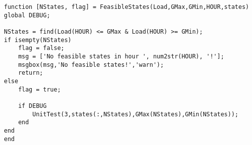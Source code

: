 \begin{verbatim}
function [NStates, flag] = FeasibleStates(Load,GMax,GMin,HOUR,states)
global DEBUG;

NStates = find(Load(HOUR) <= GMax & Load(HOUR) >= GMin);
if isempty(NStates)
    flag = false;
    msg = ['No feasible states in hour ', num2str(HOUR), '!'];
    msgbox(msg,'No feasible states!','warn');
    return;
else
    flag = true;

    if DEBUG
        UnitTest(3,states(:,NStates),GMax(NStates),GMin(NStates));
    end
end
end
\end{verbatim}

